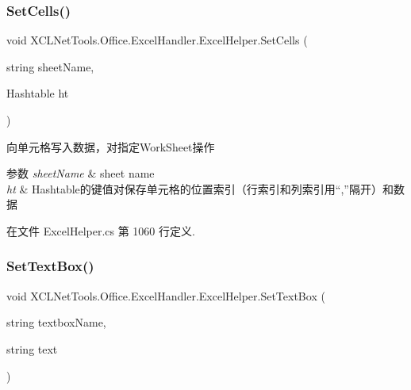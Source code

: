 \subsubsection{\texorpdfstring{Set\+Cells()}{SetCells()}\hspace{0.1cm}{\footnotesize\ttfamily [6/6]}}
{\footnotesize\ttfamily void X\+C\+L\+Net\+Tools.\+Office.\+Excel\+Handler.\+Excel\+Helper.\+Set\+Cells (\begin{DoxyParamCaption}\item[{string}]{sheet\+Name,  }\item[{Hashtable}]{ht }\end{DoxyParamCaption})}



向单元格写入数据，对指定\+Work\+Sheet操作 


\begin{DoxyParams}{参数}
{\em sheet\+Name} & sheet name\\
\hline
{\em ht} & Hashtable的键值对保存单元格的位置索引（行索引和列索引用“,”隔开）和数据\\
\hline
\end{DoxyParams}


在文件 Excel\+Helper.\+cs 第 1060 行定义.

\mbox{\label{class_x_c_l_net_tools_1_1_office_1_1_excel_handler_1_1_excel_helper_a5ae2a9cc10bd517ae122b9f74608d28f}} 
\subsubsection{\texorpdfstring{Set\+Text\+Box()}{SetTextBox()}\hspace{0.1cm}{\footnotesize\ttfamily [1/2]}}
{\footnotesize\ttfamily void X\+C\+L\+Net\+Tools.\+Office.\+Excel\+Handler.\+Excel\+Helper.\+Set\+Text\+Box (\begin{DoxyParamCaption}\item[{string}]{textbox\+Name,  }\item[{string}]{text }\end{DoxyParamCaption})}



